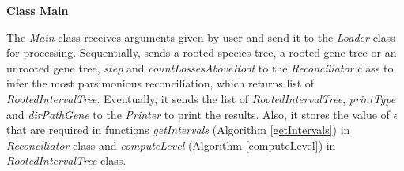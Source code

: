\noindent \textbf{Class Main}

The \emph{Main} class receives arguments given by user and send it to the \emph{Loader} class for processing. Sequentially, sends a rooted species tree, a rooted gene tree or an unrooted gene tree, \emph{step} and \emph{countLossesAboveRoot} to the \emph{Reconciliator} class to infer the most parsimonious reconciliation, which returns list of \emph{RootedIntervalTree}. Eventually, it sends the list of \emph{RootedIntervalTree}, \emph{printType} and \emph{dirPathGene} to the \emph{Printer} to print the results. Also, it stores the value of $\epsilon$ that are required in functions \emph{getIntervals} (Algorithm \ref{getIntervals}) in \emph{Reconciliator} class and \emph{computeLevel} (Algorithm \ref{computeLevel}) in \emph{RootedIntervalTree} class.  \\